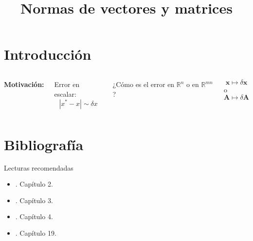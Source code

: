 \documentclass[9pt, aspectratio=169]{beamer}
\title{Normas de vectores y matrices}
\subtitle{}
\begin{document}
\maketitle

\section{Introducción}

\begin{frame}
\begin{columns}[t]
\cx
\textbf{Motivación:}

Error en escalar:
\[ |x^* - x| \sim \delta x \]

¿Cómo es el error en $\mathbb{R}^n$ o en $\mathbb{R}^{mn}$?

\[ \bm{x} \mapsto \delta \bm{x} \]
o
\[ \bm{A} \mapsto \delta \bm{A} \]
\pause
\cx

\end{columns}
\end{frame}
\section*{Bibliografía}
\begin{frame}[allowframebreaks]{Lecturas recomendadas}
\begin{itemize}
    \item {}. Capítulo 2.
    \item {}. Capítulo 3.
    \item {}. Capítulo 4.
 \item {}. Capítulo 19.
\end{itemize}
\end{frame}
\end{document}
